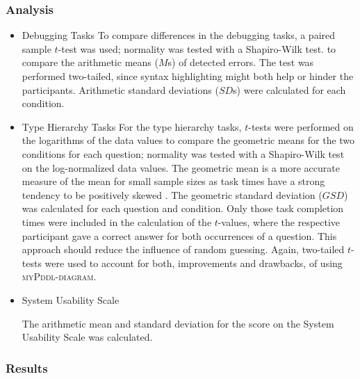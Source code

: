 \documentclass[runningheads]{llncs}
\newcommand{\mypddldiagram}{\textsc{myPddl-diagram}\xspace}
\begin{document}
\subsubsection{Analysis}

\begin{itemize}
\item Debugging Tasks
\nopagebreak
  To compare differences in the debugging tasks, a paired sample
  $t$-test was used; normality was tested with a Shapiro-Wilk
    test. to compare the arithmetic means ($M$s) of detected
  errors. The test was performed two-tailed, since syntax highlighting
  might both help or hinder the participants. Arithmetic standard
  deviations ($SD$s) were calculated for each condition.

\item Type Hierarchy Tasks
\nopagebreak
  For the type hierarchy tasks, $t$-tests were performed on the
  logarithms of the data values to compare the geometric means for the
  two conditions for each question; normality was tested with a
  Shapiro-Wilk test on the log-normalized data values. The geometric
  mean is a more accurate measure of the mean for small sample sizes
  as task times have a strong tendency to be positively skewed
  \cite{sauro2012quantifying}. The geometric standard deviation
  ($GSD$) was calculated for each question and condition. Only those
  task completion times were included in the calculation of the
  $t$-values, where the respective participant gave a correct answer
  for both occurrences of a question. This approach should reduce the
  influence of random guessing. Again, two-tailed $t$-tests were used
  to account for both, improvements and drawbacks, of using
  \mypddldiagram.

\item System Usability Scale

  The arithmetic mean and standard deviation for the score on the
  System Usability Scale was calculated.
\end{itemize}

\subsubsection{Results}
\end{document}
